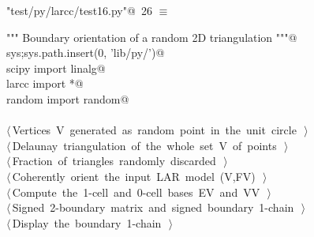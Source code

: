 \documentclass[11pt,oneside]{article}	%
\begin{document}
\begin{flushleft} \small \label{scrap45}
\protect{}\verb@"test/py/larcc/test16.py"@\nobreak\ {\footnotesize 26 }$\equiv$
\vspace{-1ex}
\begin{list}{}{} \item
\mbox{}\verb@""" Boundary orientation of a random 2D triangulation """@\\
\mbox{}\verb@import sys;sys.path.insert(0, 'lib/py/')@\\
\mbox{}\verb@from scipy import linalg@\\
\mbox{}\verb@from larcc import *@\\
\mbox{}\verb@from random import random@\\
\mbox{}\verb@@\\
\mbox{}\verb@@\hbox{$\langle\,$Vertices V generated as random point in the unit circle\nobreak\ {\footnotesize {}}$\,\rangle$}\verb@@\\
\mbox{}\verb@@\hbox{$\langle\,$Delaunay triangulation of the whole set V of points\nobreak\ {\footnotesize {}}$\,\rangle$}\verb@@\\
\mbox{}\verb@@\hbox{$\langle\,$Fraction of triangles randomly discarded\nobreak\ {\footnotesize {}}$\,\rangle$}\verb@@\\
\mbox{}\verb@@\hbox{$\langle\,$Coherently orient the input LAR model (V,FV)\nobreak\ {\footnotesize {}}$\,\rangle$}\verb@@\\
\mbox{}\verb@@\hbox{$\langle\,$Compute the 1-cell and 0-cell bases EV and VV\nobreak\ {\footnotesize {}}$\,\rangle$}\verb@@\\
\mbox{}\verb@@\hbox{$\langle\,$Signed 2-boundary matrix and signed boundary 1-chain\nobreak\ {\footnotesize {}}$\,\rangle$}\verb@@\\
\mbox{}\verb@@\hbox{$\langle\,$Display the boundary 1-chain\nobreak\ {\footnotesize {}}$\,\rangle$}\verb@@\\
\mbox{}\verb@@{\NWsep}
\end{list}
\vspace{-2ex}
\end{flushleft}
\end{document}
